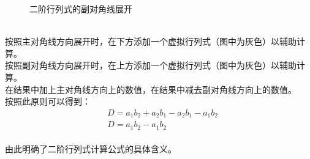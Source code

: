 \documentclass[UTF8]{ctexart}
\begin{document}
\begin{figure}[h]
\begin{center}
{
            }
            \caption{二阶行列式的副对角线展开}
        \end{center}
    \end{figure}\\
    按照主对角线方向展开时，在下方添加一个虚拟行列式（图中为灰色）以辅助计算。\\[3mm]
    按照副对角线方向展开时，在上方添加一个虚拟行列式（图中为灰色）以辅助计算。\\[3mm]
    在结果中加上主对角线方向上的数值，在结果中减去副对角线方向上的数值。\\[3mm]
    按照此原则可以得到：
    \begin{align}
        &D=a_1b_2+a_2b_1-a_2b_1-a_1b_2\\[1mm]
        &D=a_1b_2-a_1b_2
    \end{align}\\
    由此明确了二阶行列式计算公式的具体含义。
\end{document}
